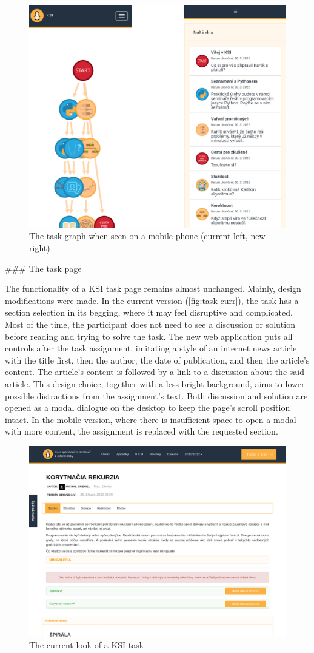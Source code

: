 \documentclass[
  digital, %
  oneside, %
  lof,     %
  nolot,     %
]{fithesis4}
\begin{document}
{\begin{figure}
\includegraphics[width=.5\textwidth]{assets/img/graph-mobile}
\caption{The task graph when seen on a mobile phone (current left, new right)}
\label{fig:graph-mobile}
\end{figure}

### The task page

The functionality of a \acrshort{KSI} task page remains almost unchanged. Mainly, design modifications were made. In the current version (\autoref{fig:task-curr}), the task has a section selection in its begging, where it may feel disruptive and complicated. Most of the time, the participant does not need to see a discussion or solution before reading and trying to solve the task. The new web application puts all controls after the task assignment, imitating a style of an internet news article with the title first, then the author, the date of publication, and then the article's content. The article's content is followed by a link to a discussion about the said article. This design choice, together with a less bright background, aims to lower possible distractions from the assignment's text. Both discussion and solution are opened as a modal dialogue on the desktop to keep the page's scroll position intact. In the mobile version, where there is insufficient space to open a modal with more content, the assignment is replaced with the requested section.

\begin{figure}
\includegraphics[width=.9\textwidth]{assets/img/task-curr}
\caption{The current look of a \acrshort{KSI} task}
\label{fig:task-curr}
\end{figure}

}
\end{document}
